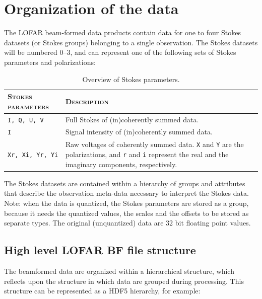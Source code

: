 \documentclass[a4paper,10pt,bibtotoc]{scrartcl}
\begin{document}

\section{Organization of the data}
\label{sec:organization of the data}
The LOFAR beam-formed data products contain data for one to four Stokes datasets (or Stokes groups) belonging to a single observation. The Stokes datasets will be numbered 0--3, and can represent one of the following sets of Stokes parameters and polarizations:

\begin{table}[ht]
  \centering
  \begin{tabular}{|lp{10cm}|}
    \hline
    \textsc{Stokes parameters} & \textsc{Description} \\
    \hline \hline
    \verb|I, Q, U, V|     & Full Stokes of (in)coherently summed data. \\
    \verb|I|              & Signal intensity of (in)coherently summed data. \\
    \verb|Xr, Xi, Yr, Yi| & Raw voltages of coherently summed data. \verb|X| and \verb|Y| are the polarizations, and \verb|r| and \verb|i| represent the real and the imaginary components, respectively. \\
    \hline
  \end{tabular}
  \caption{Overview of Stokes parameters.}
  \label{tab:stokes}
\end{table}

The Stokes datasets are contained within a hierarchy of groups and attributes that describe the observation meta-data necessary to interpret the Stokes data. Note: when the data is quantized, the Stokes parameters are stored as a group, because it needs the quantized values, the scales and the offsets to be stored as separate types. The original (unquantized) data are 32 bit floating point values.

\subsection{High level LOFAR BF file structure}
\label{sec:High level LOFAR BF file structure}

The beamformed data are organized within a hierarchical structure,
which reflects upon the structure in which data are grouped during
processing.  This structure can be represented as a HDF5 hierarchy, for example:
\end{document}
